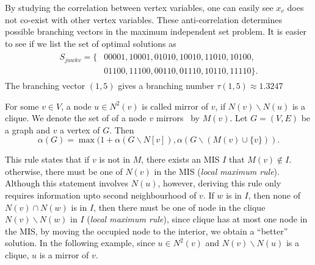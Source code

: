 \documentclass[review,onefignum,onetabnum]{siamart190516}
\newcommand{\<}{\langle}
\renewcommand{\>}{\rangle}
\newcounter{example}
\begin{document}
By studying the correlation between vertex variables, one can easily see $x_v$ does not co-exist with other vertex variables.
These anti-correlation determines possible branching vectors in the maximum independent set problem.
It is easier to see if we list the set of optimal solutions as
\begin{align}
    \begin{split}
    S_{juwkv} = \{&00001, 10001, 01010, 10010, 11010, 10100,\\&01100, 11100, 00110, 01110, 10110, 11110\}.
    \end{split}
\end{align}
The branching vector $(1,5)$ gives a branching number $\tau(1, 5) \approx 1.3247$

\begin{corollary} %
For some $v \in V$, a node $u \in N^2(v)$ is called mirror of $v$, if $N(v) \backslash N(u)$ is a clique. We denote the set of of a node $v$ mirrors~\cite{Fomin2013} by $M(v)$.
Let $G = (V, E)$ be a graph and $v$ a vertex of $G$. Then
\begin{equation}
\alpha(G) = \max(1 + \alpha(G \backslash N[v]), \alpha(G \backslash (M(v) \cup \{v\})).
\end{equation}
\end{corollary}

This rule states that if $v$ is not in $M$, there exists an MIS $I$ that $M(v)\notin I$.
otherwise, there must be one of $N(v)$ in the MIS (\textit{local maximum rule}).
Although this statement involves $N(u)$, however, deriving this rule only requires information upto second neighbourhood of $v$.
If $w$ is in $I$, then none of $N(v) \cap N(w)$ is in $I$, then there must be one of node in the clique $N(v)\backslash N(w)$ in $I$ (\textit{local maximum rule}),
since clique has at most one node in the MIS, by moving the occupied node to the interior, we obtain a ``better'' solution.
In the following example, since $u\in N^2(v)$ and $N(v) \backslash N(u)$ is a clique, $u$ is a mirror of $v$.
\end{document}
